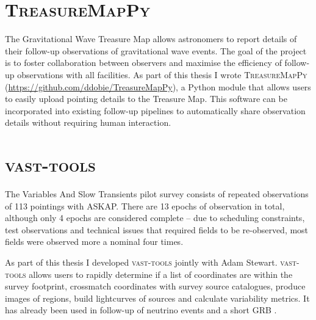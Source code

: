 \pagebreak
\section{\textsc{TreasureMapPy}}
The Gravitational Wave Treasure Map \citep[\url{treasuremap.space};][]{2020ApJ...894..127W} allows astronomers to report details of their follow-up observations of gravitational wave events. The goal of the project is to foster collaboration between observers and maximise the efficiency of follow-up observations with all facilities. As part of this thesis I wrote \textsc{TreasureMapPy} (\url{https://github.com/ddobie/TreasureMapPy}), a Python module that allows users to easily upload pointing details to the Treasure Map. This software can be incorporated into existing follow-up pipelines to automatically share observation details without requiring human interaction.

\section{\textsc{vast-tools}}
The Variables And Slow Transients \citep[VAST;][]{2013PASA...30....6M} pilot survey consists of repeated observations of 113 pointings with ASKAP. There are 13 epochs of observation in total, although only 4 epochs are considered complete -- due to scheduling constraints, test observations and technical issues that required fields to be re-observed, most fields were observed more a nominal four times.

As part of this thesis I developed \textsc{vast-tools} jointly with Adam Stewart. \textsc{vast-tools} allows users to rapidly determine if a list of coordinates are within the survey footprint, crossmatch coordinates with survey source catalogues, produce images of regions, build lightcurves of sources and calculate variability metrics. It has already been used in follow-up of neutrino events \citep{ATel12981} and a short GRB \citep{GCN27516}.